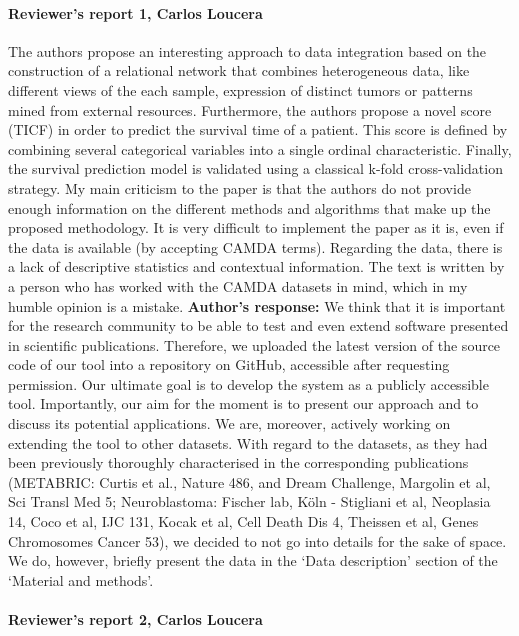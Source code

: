 \documentclass{bmcart}
\begin{document}
\paragraph {Reviewer's report 1, Carlos Loucera}
 The authors propose an interesting approach to data integration based on the construction of a relational network that combines heterogeneous data, like different views of the each sample, expression of distinct tumors or patterns mined from external resources. Furthermore, the authors propose a novel score (TICF) in order to predict the survival time of a patient. This score is defined by combining several categorical variables into a single ordinal characteristic. Finally, the survival prediction model is validated using a classical k-fold cross-validation strategy. My main criticism to the paper is that the authors do not provide enough information on the different methods and algorithms that make up the proposed methodology. It is very difficult to implement the paper as it is, even if the data is available (by accepting CAMDA terms). Regarding the data, there is a lack of descriptive statistics and contextual information. The text is written by a person who has worked with the CAMDA datasets in mind, which in my humble opinion is a mistake.
\newline \textbf{Author's response:}
We think that it is important for the research community to be able to test and even extend software presented in scientific publications. Therefore, we uploaded the latest version of the source code of our tool into a repository on GitHub, accessible after requesting permission. Our ultimate goal is to develop the system as a publicly accessible tool. Importantly, our aim for the moment is to present our approach and to discuss its potential applications. We are, moreover, actively working on extending the tool to other datasets.
With regard to the datasets, as they had been previously thoroughly characterised in the corresponding publications (METABRIC: Curtis et al., Nature 486, and Dream Challenge, Margolin et al, Sci Transl Med 5; Neuroblastoma: Fischer lab, Köln - Stigliani et al, Neoplasia 14, Coco et al, IJC 131, Kocak et al, Cell Death Dis 4, Theissen et al, Genes Chromosomes Cancer 53), we decided to not go into details for the sake of space. We do, however, briefly present the data in the ‘Data description’ section of the ‘Material and methods’.


\paragraph {Reviewer's report 2, Carlos Loucera}
\end{document}
